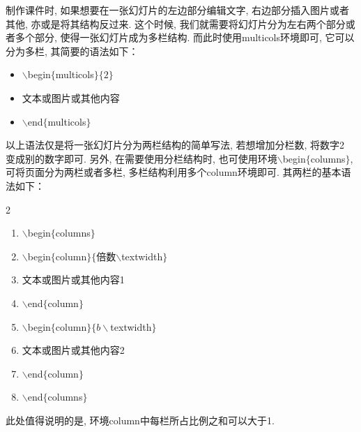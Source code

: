 制作课件时, 如果想要在一张幻灯片的左边部分编辑文字, 右边部分插入图片或者其他, 亦或是将其结构反过来. 这个时候, 我们就需要将幻灯片分为左右两个部分或者多个部分, 使得一张幻灯片成为多栏结构. 而此时使用multicols环境即可, 它可以分为多栏, 其简要的语法如下：
 \begin{itemize}
  \item $\backslash$begin$\{$multicols$\}\{2\}$
  \item 文本或图片或其他内容
 \item$\backslash$end$\{$multicols$\}$
\end{itemize}

以上语法仅是将一张幻灯片分为两栏结构的简单写法, 若想增加分栏数, 将数字2 变成别的数字即可. 另外, 在需要使用分栏结构时, 也可使用环境$\backslash$begin$\{$columns$\}$, 可将页面分为两栏或者多栏, 多栏结构利用多个column环境即可. 其两栏的基本语法如下： \vspace*{-10pt}
 \begin{multicols}{2}
 \begin{enumerate}
     \item$\backslash$begin$\{$columns$\}$
     \item$\backslash$begin$\{$column$\}\{$倍数$\backslash$textwidth$\}$
     \item 文本或图片或其他内容1
     \item$\backslash$end$\{$column$\}$
     \item$\backslash$begin$\{$column$\}\{b\backslash$textwidth$\}$
     \item 文本或图片或其他内容2
     \item$\backslash$end$\{$column$\}$
     \item$\backslash$end$\{$columns$\}$
 \end{enumerate}
 \end{multicols}\vspace*{-10pt}

 此处值得说明的是, 环境column中每栏所占比例之和可以大于1.


